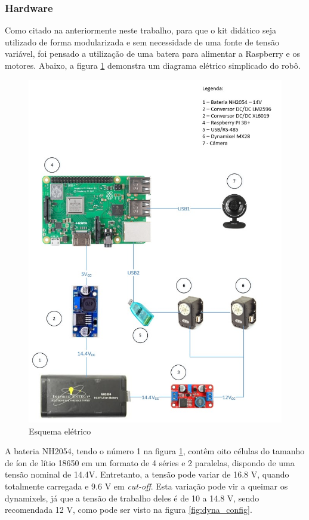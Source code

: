 \subsubsection{Hardware}
Como citado na anteriormente neste trabalho, para que o kit didático seja utilizado de forma modularizada e sem necessidade de uma fonte de tensão variável, foi pensado a utilização de uma batera para alimentar a Raspberry e os motores. Abaixo, a figura \ref{fig:esq_ele} demonstra um diagrama elétrico simplicado do robô.

\begin{figure}[H]
	\centering
	\includegraphics[scale=0.6, angle=0]{Figures/diagrama.jpeg}
	\caption{Esquema elétrico}
	\label{fig:esq_ele}
\end{figure}

A bateria NH2054, tendo o número 1 na figura \ref{fig:esq_ele}, contêm oito células do tamanho de íon de lítio 18650 em um formato de 4 séries e 2 paralelas, dispondo de uma tensão nominal de 14.4V. Entretanto, a tensão pode variar de 16.8 V, quando totalmente carregada e 9.6 V em \textit{cut-off}. Esta variação pode vir a queimar os dynamixels, já que a tensão de trabalho deles é de 10 a 14.8 V, sendo recomendada 12 V, como pode ser visto na figura \ref{fig:dyna_config}.

